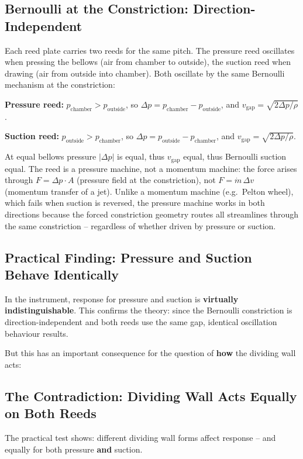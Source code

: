 \documentclass[11pt,a4paper]{article}
\begin{document}
\subsection{Bernoulli at the Constriction: Direction-Independent}

Each reed plate carries two reeds for the same pitch. The pressure reed oscillates when pressing the bellows (air from chamber to outside), the suction reed when drawing (air from outside into chamber). Both oscillate by the same Bernoulli mechanism at the constriction:

\textbf{Pressure reed:} $p_\text{chamber} > p_\text{outside}$, so $\Delta p = p_\text{chamber} - p_\text{outside}$, and $v_\text{gap} = \sqrt{2\Delta p/\rho}$.

\textbf{Suction reed:} $p_\text{outside} > p_\text{chamber}$, so $\Delta p = p_\text{outside} - p_\text{chamber}$, and $v_\text{gap} = \sqrt{2\Delta p/\rho}$.

At equal bellows pressure $|\Delta p|$ is equal, thus $v_\text{gap}$ equal, thus Bernoulli suction equal. The reed is a pressure machine, not a momentum machine: the force arises through $F = \Delta p \cdot A$ (pressure field at the constriction), not $F = \dot{m}\,\Delta v$ (momentum transfer of a jet). Unlike a momentum machine (e.g.\ Pelton wheel), which fails when suction is reversed, the pressure machine works in both directions because the forced constriction geometry routes all streamlines through the same constriction -- regardless of whether driven by pressure or suction.

\subsection{Practical Finding: Pressure and Suction Behave Identically}

In the instrument, response for pressure and suction is \textbf{virtually indistinguishable}. This confirms the theory: since the Bernoulli constriction is direction-independent and both reeds use the same gap, identical oscillation behaviour results.

But this has an important consequence for the question of \textbf{how} the dividing wall acts:

\subsection{The Contradiction: Dividing Wall Acts Equally on Both Reeds}

The practical test shows: different dividing wall forms affect response -- and equally for both pressure \textbf{and} suction.
\end{document}

